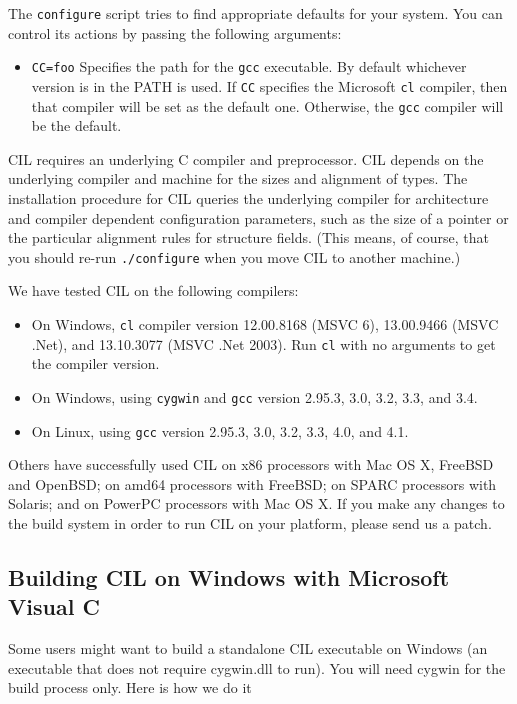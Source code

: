\documentclass[letterpaper]{article}
\def\t#1{{\tt #1}}
\begin{document}
 The \t{configure} script tries to find appropriate defaults for your system.
You can control its actions by passing the following arguments:
\begin{itemize}
\item \t{CC=foo} Specifies the path for the \t{gcc} executable. By default
whichever version is in the PATH is used. If \t{CC} specifies the Microsoft
\t{cl} compiler, then that compiler will be set as the default one. Otherwise,
the \t{gcc} compiler will be the default.
\end{itemize}

 CIL requires an underlying C compiler and preprocessor. CIL depends on the
underlying compiler and machine for the sizes and alignment of types. The
installation procedure for CIL queries the underlying compiler for
architecture and compiler dependent configuration parameters, such as the size
of a pointer or the particular alignment rules for structure fields. (This
means, of course, that you should re-run \t{./configure} when you move CIL to
another machine.)

We have tested CIL on the following compilers:

\begin{itemize}
\item On Windows, \t{cl} compiler version 12.00.8168 (MSVC 6),
  13.00.9466 (MSVC .Net), and 13.10.3077 (MSVC .Net 2003).  Run \t{cl}
  with no arguments to get the compiler version.  
\item On Windows, using \t{cygwin} and \t{gcc} version 2.95.3, 3.0,
  3.2, 3.3, and 3.4.
\item On Linux, using \t{gcc} version 2.95.3, 3.0, 3.2, 3.3, 4.0, and 4.1.
\end{itemize}

Others have successfully used CIL on x86 processors with Mac OS X,
FreeBSD and OpenBSD; on amd64 processors with FreeBSD; on SPARC
processors with Solaris; and on PowerPC processors with Mac OS X.  If
you make any changes to the build system in order to run CIL on your
platform, please send us a patch.

  \subsection{Building CIL on Windows with Microsoft Visual C}

 Some users might want to build a standalone CIL executable on Windows (an
executable that does not require cygwin.dll to run). You will need cygwin for
the build process only. Here is how we do it
\end{document}

